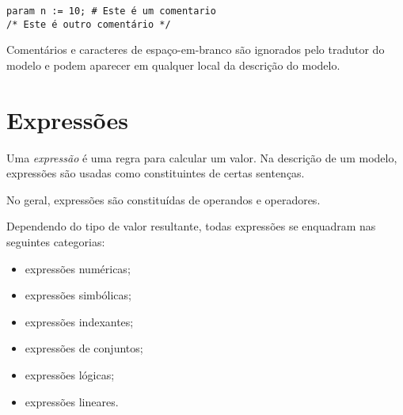 \documentclass[11pt, brazil]{report}
\def\para#1{\noindent{\bf#1}}
\begin{document}
\para{Exemplos}

\begin{verbatim}
param n := 10; # Este é um comentario
/* Este é outro comentário */
\end{verbatim}

Comentários e caracteres de espaço-em-branco são ignorados pelo tradutor
do modelo e podem aparecer em qualquer local da descrição do modelo.



\newpage

\chapter{Expressões}

Uma {\it expressão} é uma regra para calcular um valor. Na descrição
de um modelo, expressões são usadas como constituintes de certas sentenças.

No geral, expressões são constituídas de operandos e operadores.

Dependendo do tipo de valor resultante, todas expressões se enquadram nas
seguintes categorias:

%
%

\vspace*{-8pt}

\begin{itemize}
\item expressões numéricas;
\item expressões simbólicas;
\item expressões indexantes;
\item expressões de conjuntos;
\item expressões lógicas;
\item expressões lineares.
\end{itemize}

\end{document}
